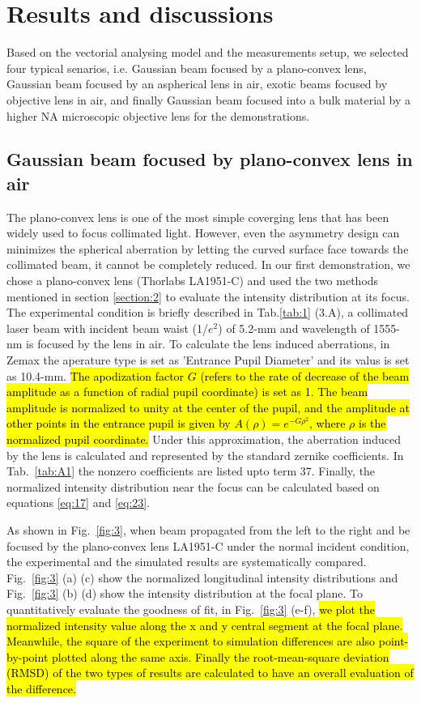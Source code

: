 \documentclass[9pt,twocolumn,twoside]{osajnl}
\begin{document}
\section{Results and discussions} \label{section:3}
Based on the vectorial analysing model and the measurements setup, we selected four typical senarios, i.e. Gaussian beam focused by a plano-convex lens, Gaussian beam focused by an aspherical lens in air, exotic beams focused by objective lens in air, and finally Gaussian beam focused into a bulk material by a higher NA microscopic objective lens for the demonstrations.
\subsection{Gaussian beam focused by plano-convex lens in air}
The plano-convex lens is one of the most simple coverging lens that has been widely used to focus collimated light. However, even the asymmetry design can minimizes the spherical aberration by letting the curved surface face towards the collimated beam, it cannot be completely reduced. In our first demonstration, we chose a plano-convex lens (Thorlabs LA1951-C) and used the two methods mentioned in section \ref{section:2} to evaluate the intensity distribution at its focus. The experimental condition is briefly described in Tab.\ref{tab:1} (3.A), a collimated laser beam with incident beam waist (1/$e^2$) of 5.2-mm and wavelength of 1555-nm is focused by the lens in air. To calculate the lens induced aberrations, in Zemax the aperature type is set as 'Entrance Pupil Diameter' and its valus is set as 10.4-mm. \hl{The apodization factor $G$ (refers to the rate of decrease of the beam amplitude as a function of radial pupil coordinate) is set as 1. The beam amplitude is normalized to unity at the center of the pupil, and the amplitude at other points in the entrance pupil is given by $A(\rho)=e^{-G\rho^2}$, where $\rho$ is the normalized pupil coordinate.} Under this approximation, the aberration induced by the lens is calculated and represented by the standard zernike coefficients. In Tab.~\ref{tab:A1} the nonzero coefficients are listed upto term 37. Finally, the normalized intensity distribution near the focus can be calculated based on equations \eqref{eq:17} and \eqref{eq:23}. 


As shown in Fig.~\ref{fig:3}, when beam propagated from the left to the right and be focused by the plano-convex lens LA1951-C under the normal incident condition, the experimental and the simulated results are systematically compared. Fig.~\ref{fig:3} (a) (c) show the normalized longitudinal intensity distributions and Fig.~\ref{fig:3} (b) (d) show the intensity distribution at the focal plane. To quantitatively evaluate the goodness of fit, in Fig.~\ref{fig:3} (e-f), \hl{we plot the normalized intensity value along the x and y central segment at the focal plane. Meanwhile, the square of the experiment to simulation differences are also point-by-point plotted along the same axis. Finally the root-mean-square deviation (RMSD) of the two types of results are calculated to have an overall evaluation of the difference.}
\end{document}

